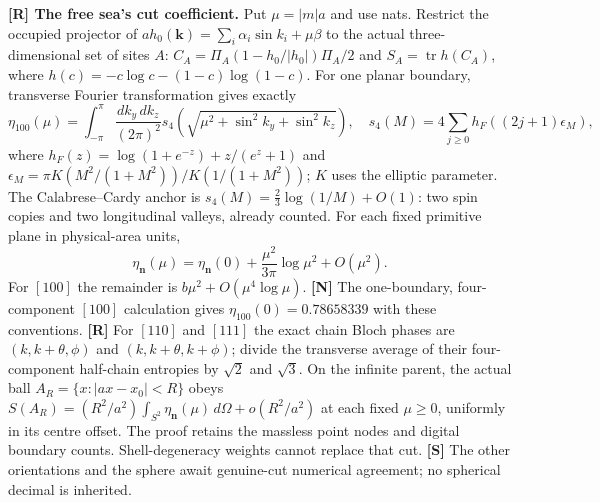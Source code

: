 \noindent\textbf{[R] The free sea's cut coefficient.}
Put $\mu=|m|a$ and use nats.  Restrict the occupied projector of
$a h_0(\mathbf k)=\sum_i\alpha_i\sin k_i+\mu\beta$ to the actual
three-dimensional set of sites $A$:
$C_A=\Pi_A(1-h_0/|h_0|)\Pi_A/2$ and
$S_A=\operatorname{tr}h(C_A)$, where
$h(c)=-c\log c-(1-c)\log(1-c)$.
For one planar boundary, transverse Fourier transformation gives exactly
\[
 \eta_{100}(\mu)=\int_{-\pi}^{\pi}\!\frac{d k_y\,d k_z}{(2\pi)^2}
 s_4\!\left(\sqrt{\mu^2+\sin^2 k_y+\sin^2 k_z}\right),\quad
 s_4(M)=4\sum_{j\geq0}h_F((2j+1)\epsilon_M),
\]
where $h_F(z)=\log(1+e^{-z})+z/(e^z+1)$ and
$\epsilon_M=\pi K(M^2/(1+M^2))/K(1/(1+M^2))$; $K$ uses the
elliptic parameter.  The Calabrese--Cardy anchor is
$s_4(M)=\tfrac23\log(1/M)+O(1)$: two spin copies and two longitudinal
valleys, already counted.  For each fixed primitive plane in physical-area units,
\[
 \eta_{\mathbf n}(\mu)=\eta_{\mathbf n}(0)
       +\frac{\mu^2}{3\pi}\log\mu^2+O(\mu^2).
\]
For $[100]$ the remainder is $b\mu^2+O(\mu^4\log\mu)$.
\textbf{[N]} The one-boundary, four-component
$[100]$ calculation gives $\eta_{100}(0)=0.78658339$ with these conventions.
\textbf{[R]} For $[110]$ and $[111]$ the exact chain Bloch phases are
$(k,k+\theta,\phi)$ and $(k,k+\theta,k+\phi)$; divide the transverse
average of their four-component half-chain entropies by $\sqrt2$ and
$\sqrt3$.  On the infinite parent, the actual ball
$A_R=\{x:|ax-x_0|<R\}$ obeys
$S(A_R)=(R^2/a^2)\int_{S^2}\eta_{\mathbf n}(\mu)\,d\Omega
+o(R^2/a^2)$ at each fixed $\mu\geq0$, uniformly in its centre offset.
The proof retains the massless point nodes and digital boundary counts.
Shell-degeneracy weights cannot replace that cut.
\textbf{[S]} The other orientations and the sphere await genuine-cut
numerical agreement; no spherical decimal is inherited.

